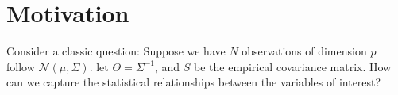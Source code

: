 \documentclass[twoside]{article}
\begin{document}

\section{Motivation}
Consider a classic question: Suppose we have $N$ observations of dimension $p$ follow $\mathcal{N}(\mu,\Sigma)$. let $\Theta = \Sigma^{-1}$, and $S$ be the empirical covariance matrix. How can we capture the statistical relationships between the variables of interest?

%
%
\end{document}
